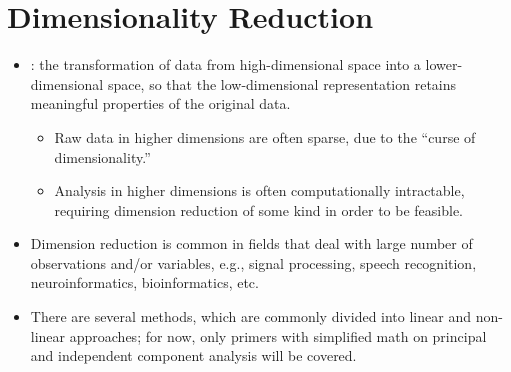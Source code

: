 \section{Dimensionality Reduction}
\begin{itemize}
  \item {}: the transformation of data from high-dimensional space into a lower-dimensional space, so that the low-dimensional representation retains meaningful properties of the original data.
    \begin{itemize}
      \item Raw data in higher dimensions are often sparse, due to the ``curse of dimensionality.''
      \item Analysis in higher dimensions is often computationally intractable, requiring dimension reduction of some kind in order to be feasible.
    \end{itemize}
  \item Dimension reduction is common in fields that deal with large number of observations and/or variables, e.g., signal processing, speech recognition, neuroinformatics, bioinformatics, etc.
  \item There are several methods, which are commonly divided into linear and non-linear approaches; for now, only primers with simplified math on principal and independent component analysis will be covered.


\end{itemize}

